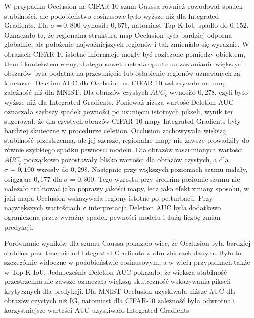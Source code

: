 W przypadku Occlusion na CIFAR-10 szum Gaussa również powodował spadek stabilności, ale podobieństwo cosinusowe było wyższe niż dla Integrated Gradients. Dla $\sigma = 0{,}800$ wynosiło $0{,}676$, natomiast Top-K IoU spadło do $0{,}152$. Oznaczało to, że regionalna struktura map Occlusion była bardziej odporna globalnie, ale położenie najważniejszych regionów i tak zmieniało się wyraźnie. W obrazach CIFAR-10 istotne informacje mogły być rozłożone pomiędzy obiektem, tłem i kontekstem sceny, dlatego nawet metoda oparta na zasłanianiu większych obszarów była podatna na przesunięcie lub osłabienie regionów uznawanych za kluczowe. Deletion AUC dla Occlusion na CIFAR-10 wskazywało na inną zależność niż dla MNIST. Dla obrazów czystych $\overline{AUC}_{c}$ wynosiło $0{,}278$, czyli było wyższe niż dla Integrated Gradients. Ponieważ niższa wartość Deletion AUC oznaczała szybszy spadek pewności po usunięciu istotnych pikseli, wynik ten sugerował, że dla czystych obrazów CIFAR-10 mapy Integrated Gradients były bardziej skuteczne w procedurze deletion. Occlusion zachowywała większą stabilność przestrzenną, ale jej szersze, regionalne mapy nie zawsze prowadziły do równie szybkiego spadku pewności modelu. Dla obrazów zaszumionych wartości $\overline{AUC}_{p}$ początkowo pozostawały blisko wartości dla obrazów czystych, a dla $\sigma = 0{,}100$ wzrosły do $0{,}298$. Następnie przy większych poziomach szumu malały, osiągając $0{,}177$ dla $\sigma = 0{,}800$. Tego wzrostu przy średnim poziomie szumu nie należało traktować jako poprawy jakości mapy, lecz jako efekt zmiany sposobu, w jaki mapa Occlusion wskazywała regiony istotne po perturbacji. Przy największych wartościach $\sigma$ interpretacja Deletion AUC była dodatkowo ograniczona przez wyraźny spadek pewności modelu i dużą liczbę zmian predykcji.

Porównanie wyników dla szumu Gaussa pokazało więc, że Occlusion była bardziej stabilna przestrzennie od Integrated Gradients w obu zbiorach danych. Było to szczególnie widoczne w podobieństwie cosinusowym, a w wielu przypadkach także w Top-K IoU. Jednocześnie Deletion AUC pokazało, że większa stabilność przestrzenna nie zawsze oznaczała większą skuteczność wskazywania pikseli krytycznych dla predykcji. Dla MNIST Occlusion uzyskiwała niższe AUC dla obrazów czystych niż IG, natomiast dla CIFAR-10 zależność była odwrotna i korzystniejsze wartości AUC uzyskiwało Integrated Gradients.

